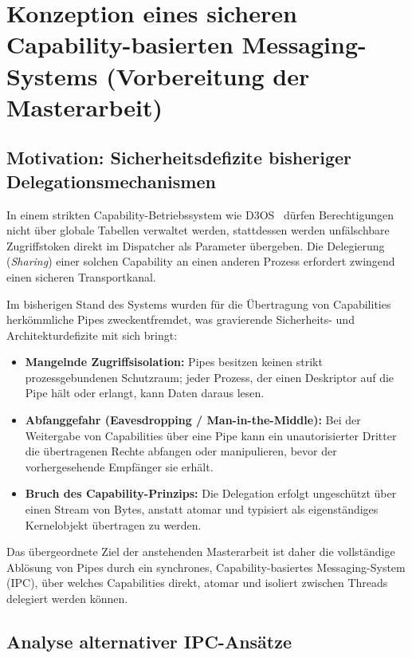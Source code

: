 \chapter{Konzeption eines sicheren Capability-basierten Messaging-Systems (Vorbereitung der Masterarbeit)}
\label{chap:konzeption_messaging}

\section{Motivation: Sicherheitsdefizite bisheriger Delegationsmechanismen}

In einem strikten Capability-Betriebssystem wie D3OS~\cite{d3os} dürfen Berechtigungen nicht über globale Tabellen verwaltet werden, stattdessen werden unfälschbare Zugriffstoken direkt im Dispatcher als Parameter übergeben. Die Delegierung (\textit{Sharing}) einer solchen Capability an einen anderen Prozess erfordert zwingend einen sicheren Transportkanal.

Im bisherigen Stand des Systems wurden für die Übertragung von Capabilities herkömmliche Pipes zweckentfremdet, was gravierende Sicherheits- und Architekturdefizite mit sich bringt:

\begin{itemize}
    \item \textbf{Mangelnde Zugriffsisolation:} Pipes besitzen keinen strikt prozessgebundenen Schutzraum; jeder Prozess, der einen Deskriptor auf die Pipe hält oder erlangt, kann Daten daraus lesen.
    \item \textbf{Abfanggefahr (Eavesdropping / Man-in-the-Middle):} Bei der Weitergabe von Capabilities über eine Pipe kann ein unautorisierter Dritter die übertragenen Rechte abfangen oder manipulieren, bevor der vorhergesehende Empfänger sie erhält.
    \item \textbf{Bruch des Capability-Prinzips:} Die Delegation erfolgt ungeschützt über einen Stream von Bytes, anstatt atomar und typisiert als eigenständiges Kernelobjekt übertragen zu werden.
\end{itemize}

Das übergeordnete Ziel der anstehenden Masterarbeit ist daher die vollständige Ablösung von Pipes durch ein synchrones, Capability-basiertes Messaging-System (IPC), über welches Capabilities direkt, atomar und isoliert zwischen Threads delegiert werden können.


\section{Analyse alternativer IPC-Ansätze}

